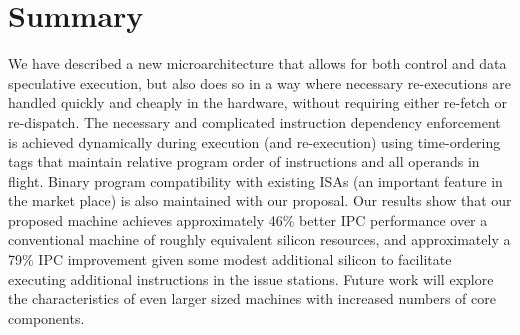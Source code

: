 \documentclass[10pt,twocolumn,dvips]{article}
\begin{document}
\section{Summary}
%
We have described a new microarchitecture that
allows for both control and data speculative execution,
but also does so 
in a way where necessary re-executions are handled
quickly and cheaply in the hardware, without requiring either
re-fetch or re-dispatch.  
The necessary and complicated instruction dependency
enforcement is achieved dynamically during execution (and re-execution)
using time-ordering tags that maintain relative program order
of instructions and all operands in flight.
Binary program compatibility with existing ISAs (an important feature
in the market place) is also maintained with our proposal.
Our results show that our proposed machine achieves approximately
46\% better IPC performance over a conventional machine of roughly
equivalent silicon resources, and approximately a 79\%
IPC improvement given some modest additional silicon to facilitate
executing additional instructions in the issue stations.
Future work will explore the characteristics of even larger
sized machines with increased numbers of core components.
%


%
\end{document}
